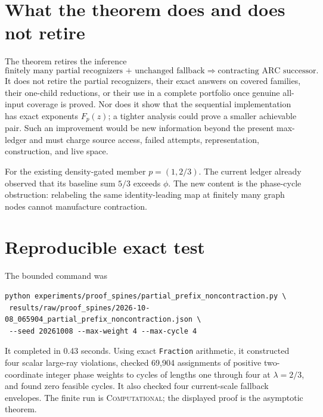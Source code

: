 \documentclass[11pt]{article}
\begin{document}
\section{What the theorem does and does not retire}
The theorem retires the inference
\[
 \text{finitely many partial recognizers + unchanged fallback}
 \Longrightarrow \text{contracting ARC successor}.
\]
It does not retire the partial recognizers, their exact answers on covered
families, their one-child reductions, or their use in a complete portfolio
once genuine all-input coverage is proved.  Nor does it show that the
sequential implementation has exact exponents \(F_p(z)\); a tighter analysis
could prove a smaller achievable pair.  Such an improvement would be new
information beyond the present max-ledger and must charge source access,
failed attempts, representation, construction, and live space.

For the existing density-gated member \(p=(1,2/3)\).  The current ledger
already observed that its baseline sum \(5/3\) exceeds \(\phi\).  The new
content is the phase-cycle obstruction: relabeling the same identity-leading
map at finitely many graph nodes cannot manufacture contraction.

\section{Reproducible exact test}
The bounded command was
\begin{verbatim}
python experiments/proof_spines/partial_prefix_noncontraction.py \
 results/raw/proof_spines/2026-10-08_065904_partial_prefix_noncontraction.json \
 --seed 20261008 --max-weight 4 --max-cycle 4
\end{verbatim}
It completed in 0.43 seconds.  Using exact \texttt{Fraction} arithmetic, it
constructed four scalar large-ray violations, checked 69,904 assignments of
positive two-coordinate integer phase weights to cycles of lengths one
through four at \(\lambda=2/3\), and found zero feasible cycles.  It also
checked four current-scale fallback envelopes.  The finite run is
\textsc{Computational}; the displayed proof is the asymptotic theorem.
\end{document}
